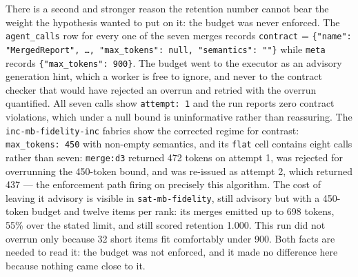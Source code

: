 \documentclass[11pt]{article}
\begin{document}
There is a second and stronger reason the retention number cannot bear the weight the
hypothesis wanted to put on it: the budget was never enforced. The \texttt{agent\_calls}
row for every one of the seven merges records \texttt{contract} =
\texttt{\{"name": "MergedReport", \dots, "max\_tokens": null, "semantics": ""\}} while
\texttt{meta} records \texttt{\{"max\_tokens": 900\}}. The budget went to the executor as
an advisory generation hint, which a worker is free to ignore, and never to the contract
checker that would have rejected an overrun and retried with the overrun quantified. All
seven calls show \texttt{attempt: 1} and the run reports zero contract violations, which
under a null bound is uninformative rather than reassuring. The
\texttt{inc-mb-fidelity-inc} fabrics show the corrected regime for contrast:
\texttt{max\_tokens: 450} with non-empty semantics, and its \texttt{flat} cell contains
eight calls rather than seven: \texttt{merge:d3} returned 472 tokens on attempt 1, was
rejected for overrunning the 450-token bound, and was re-issued as attempt 2, which
returned 437 --- the enforcement path firing on precisely this algorithm. The cost
of leaving it advisory is visible in \texttt{sat-mb-fidelity}, still advisory but with a
450-token budget and twelve items per rank: its merges emitted up to 698 tokens, 55\%
over the stated limit, and still scored retention 1.000. This run did not overrun only
because 32 short items fit comfortably under 900. Both facts are needed to read it: the
budget was not enforced, and it made no difference here because nothing came close to
it.
\end{document}
